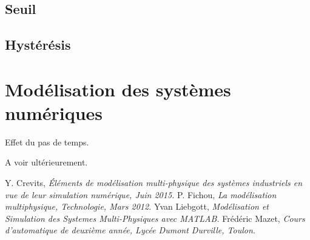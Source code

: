 \documentclass[10pt,fleqn]{article} %
\begin{document}
\subsection{Seuil}

\subsection{Hystérésis}

\section{Modélisation des systèmes numériques}
Effet du pas de temps.

A voir ultérieurement. 


\begin{thebibliography}{2}
    Y. Crevits, {\it Éléments de modélisation multi-physique des systèmes industriels en vue de leur simulation numérique, Juin 2015.}
    P. Fichou, {\it La modélisation multiphysique, Technologie, Mars 2012.}
    Yvan Liebgott, {\it Modélisation et Simulation des Systemes Multi-Physiques avec MATLAB.}
    Frédéric Mazet, {\it Cours d'automatique de deuxième année, Lycée Dumont Durville, Toulon.}
\end{thebibliography}
\end{document}
